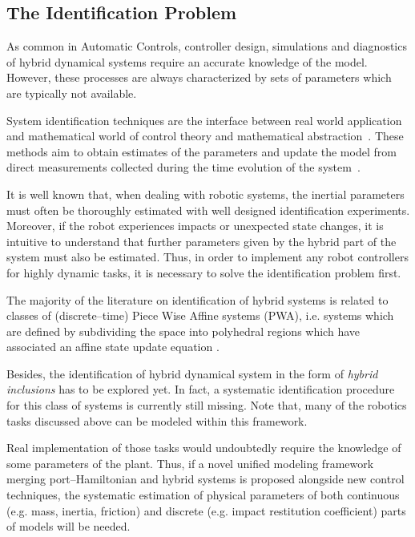 \subsection{The Identification Problem}
%
As common in Automatic Controls, controller design, simulations and diagnostics of hybrid dynamical systems require an accurate knowledge of the model. However, these {processes} are always characterized by sets of parameters which are typically not available.
%
\newline

%
System identification techniques are the interface between real world application and mathematical world of control theory and mathematical abstraction~\citep{LJUNG20101}. These methods aim to obtain estimates of the parameters and update the model from direct measurements collected during the time evolution of the system~\citep{soderstrom2018errors,SODERSTROM2019}.
%
\newline

%
It is well known that, when dealing with robotic systems, the inertial parameters must often be thoroughly estimated with well designed identification experiments. Moreover, if the robot experiences impacts or unexpected state changes, it is intuitive to understand that further parameters given by the hybrid part of the system must also be estimated. 
Thus, in order to implement any robot controllers for highly dynamic tasks, it is necessary to solve the identification problem first.
%
\newline

%
The majority of the literature on identification of hybrid systems is related to classes of (discrete--time) Piece Wise Affine systems (PWA), i.e. systems which are defined by subdividing the  space into polyhedral regions which have associated an affine state update equation \citep{Bemporad,Ferrari,Juloski,juloski2005bayesian,Paoletti}.
% 
\newline

%
Besides, the identification of hybrid dynamical system in the form of \textit{hybrid inclusions} has to be explored yet. In fact, a systematic identification procedure for this class of systems is currently still missing. Note that, many of the robotics tasks discussed above can be modeled within this framework.
%
\newline

%
Real implementation of those tasks would undoubtedly require the knowledge of some parameters of the plant. Thus, if a novel unified modeling framework merging port--Hamiltonian and hybrid systems is proposed alongside new control techniques, the systematic estimation of physical parameters of both continuous (e.g. mass, inertia, friction) and discrete (e.g. impact restitution coefficient) parts of models  will be needed.
%
\clearpage

